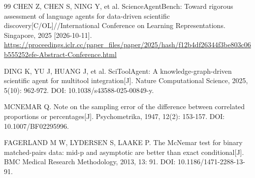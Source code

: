 \documentclass{dcfp}
\begin{document}
\begin{PaperBody}
\begin{thebibliography}{99}
 CHEN Z, CHEN S, NING Y, et al. ScienceAgentBench: Toward rigorous assessment of language agents for data-driven scientific discovery[C/OL]//International Conference on Learning Representations. Singapore, 2025 [2026-10-11]. \url{https://proceedings.iclr.cc/paper_files/paper/2025/hash/f12b4df26344f3be803c06b555252efe-Abstract-Conference.html}

 DING K, YU J, HUANG J, et al. SciToolAgent: A knowledge-graph-driven scientific agent for multitool integration[J]. Nature Computational Science, 2025, 5(10): 962-972. DOI: 10.1038/s43588-025-00849-y.

 MCNEMAR Q. Note on the sampling error of the difference between correlated proportions or percentages[J]. Psychometrika, 1947, 12(2): 153-157. DOI: 10.1007/BF02295996.

 FAGERLAND M W, LYDERSEN S, LAAKE P. The McNemar test for binary matched-pairs data: mid-p and asymptotic are better than exact conditional[J]. BMC Medical Research Methodology, 2013, 13: 91. DOI: 10.1186/1471-2288-13-91.

\end{thebibliography}

\end{PaperBody}
\end{document}
